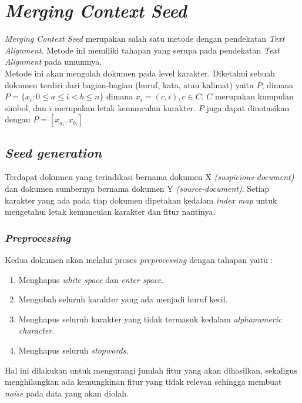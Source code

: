 \documentclass[../Proposal.tex]{subfiles}
\begin{document}
	\section{\textit{Merging Context Seed}}
	\textit{Merging Context Seed} merupakan salah satu metode dengan pendekatan \textit{Text Alignment}. Metode ini memiliki tahapan yang serupa pada pendekatan \textit{Text Alignment}\cite{mcs, overview6} pada umumnya. \\
	 
	 \noindent Metode ini akan mengolah dokumen pada level karakter. Diketahui sebuah dokumen terdiri dari bagian-bagian (huruf, kata, atau kalimat) yaitu $P$, dimana $P = \{x_{i} : 0 \leq a \leq i < b \leq n \}$ dimana $x_{i} = (c,i), c \in C$. $C$ merupakan kumpulan simbol, dan $i$ merupakan letak kemunculan karakter. $P$ juga dapat dinotasikan dengan $P = [ x_{a_{i}}, x_{b_{i}} ]$

	\subsection{\textit{Seed generation}}
		Terdapat dokumen yang terindikasi bernama dokumen X \textit{(suspicious-document)} dan dokumen sumbernya bernama dokumen Y \textit{(source-document)}. Setiap karakter yang ada pada tiap dokumen dipetakan kedalam \textit{index map} untuk mengetahui letak kemunculan karakter dan fitur nantinya. \\

		\subsubsection{\textit{Preprocessing}}
		Kedua dokumen akan melalui proses \textit{preprocessing} dengan tahapan yaitu : 

		\begin{enumerate}
			\item Menghapus \textit{white space} dan \textit{enter space}.
			\item Mengubah seluruh karakter yang ada menjadi huruf kecil.
			\item Menghapus seluruh karakter yang tidak termasuk kedalam \textit{alphanumeric character}.
			\item Menghapus seluruh \textit{stopwords}.
		\end{enumerate}

		\noindent Hal ini dilakukan untuk mengurangi jumlah fitur yang akan dihasilkan, sekaligus menghilangkan ada kemungkinan fitur yang tidak relevan sehingga membuat \textit{noise} pada data yang akan diolah. \\
\end{document}

